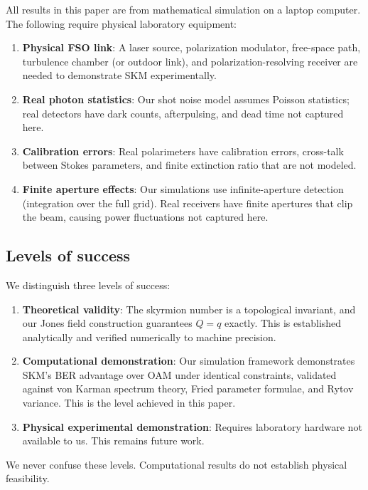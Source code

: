 \documentclass[11pt]{article}
\begin{document}
All results in this paper are from mathematical simulation on a laptop
computer. The following require physical laboratory equipment:

\begin{enumerate}
\item \textbf{Physical FSO link}: A laser source, polarization
modulator, free-space path, turbulence chamber (or outdoor link), and
polarization-resolving receiver are needed to demonstrate SKM experimentally.
\item \textbf{Real photon statistics}: Our shot noise model assumes
Poisson statistics; real detectors have dark counts, afterpulsing, and
dead time not captured here.
\item \textbf{Calibration errors}: Real polarimeters have calibration
errors, cross-talk between Stokes parameters, and finite extinction ratio
that are not modeled.
\item \textbf{Finite aperture effects}: Our simulations use infinite-aperture
detection (integration over the full grid). Real receivers have finite
apertures that clip the beam, causing power fluctuations not captured here.
\end{enumerate}

\subsection{Levels of success}

We distinguish three levels of success:

\begin{enumerate}
\item \textbf{Theoretical validity}: The skyrmion number is a topological
invariant, and our Jones field construction guarantees $Q = q$ exactly.
This is established analytically and verified numerically to machine
precision.
\item \textbf{Computational demonstration}: Our simulation framework
demonstrates SKM's BER advantage over OAM under identical constraints,
validated against von Karman spectrum theory, Fried parameter formulae,
and Rytov variance. This is the level achieved in this paper.
\item \textbf{Physical experimental demonstration}: Requires laboratory
hardware not available to us. This remains future work.
\end{enumerate}

We never confuse these levels. Computational results do not establish
physical feasibility.
\end{document}
